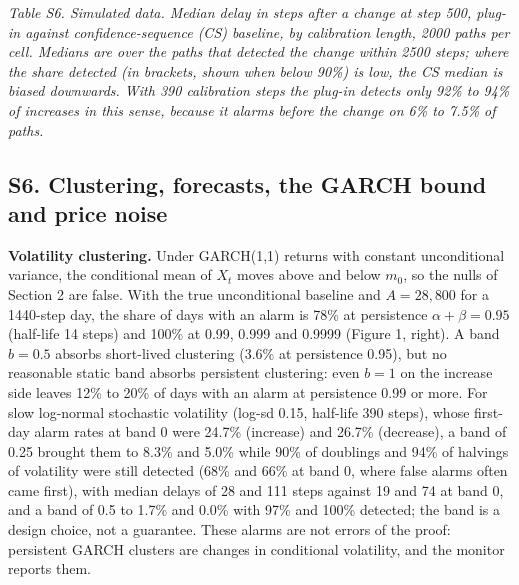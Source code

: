 \documentclass[
]{article}
\begin{document}
\emph{Table S6. Simulated data. Median delay in steps after a change at
step 500, plug-in against confidence-sequence (CS) baseline, by
calibration length, 2000 paths per cell. Medians are over the paths that
detected the change within 2500 steps; where the share detected (in
brackets, shown when below 90\%) is low, the CS median is biased
downwards. With 390 calibration steps the plug-in detects only 92\% to
94\% of increases in this sense, because it alarms before the change on
6\% to 7.5\% of paths.}

\hypertarget{s6.-clustering-forecasts-the-garch-bound-and-price-noise}{%
\subsection{S6. Clustering, forecasts, the GARCH bound and price
noise}\label{s6.-clustering-forecasts-the-garch-bound-and-price-noise}}

\textbf{Volatility clustering.} Under GARCH(1,1) returns with constant
unconditional variance, the conditional mean of \(X_t\) moves above and
below \(m_0\), so the nulls of Section 2 are false. With the true
unconditional baseline and \(A = 28{,}800\) for a 1440-step day, the
share of days with an alarm is 78\% at persistence
\(\alpha + \beta = 0.95\) (half-life 14 steps) and 100\% at 0.99, 0.999
and 0.9999 (Figure 1, right). A band \(b = 0.5\) absorbs short-lived
clustering (3.6\% at persistence 0.95), but no reasonable static band
absorbs persistent clustering: even \(b = 1\) on the increase side
leaves 12\% to 20\% of days with an alarm at persistence 0.99 or more.
For slow log-normal stochastic volatility (log-sd 0.15, half-life 390
steps), whose first-day alarm rates at band 0 were 24.7\% (increase) and
26.7\% (decrease), a band of 0.25 brought them to 8.3\% and 5.0\% while
90\% of doublings and 94\% of halvings of volatility were still detected
(68\% and 66\% at band 0, where false alarms often came first), with
median delays of 28 and 111 steps against 19 and 74 at band 0, and a
band of 0.5 to 1.7\% and 0.0\% with 97\% and 100\% detected; the band is
a design choice, not a guarantee. These alarms are not errors of the
proof: persistent GARCH clusters are changes in conditional volatility,
and the monitor reports them.
\end{document}
